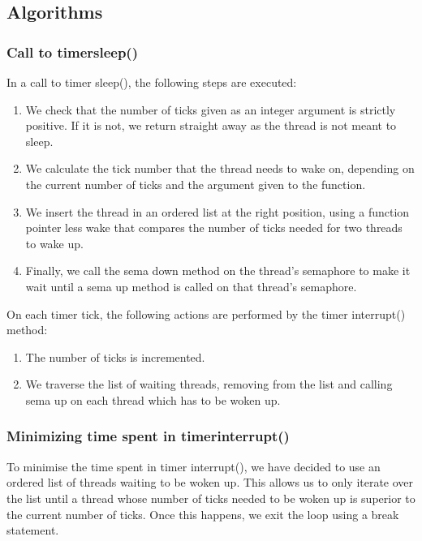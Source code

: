 \documentclass{article}
\renewcommand{\_}{\char`_}
\begin{document}
\subsection{Algorithms}
\subsubsection{Call to timer\textunderscore sleep()}

In a call to timer \textunderscore sleep(), the following steps are executed:

\begin{enumerate}
    \item We check that the number of ticks given as an integer argument is strictly positive. If it is not, we return straight away as the thread is not meant to sleep.
    \item We calculate the tick number that the thread needs to wake on, depending on the current number of ticks and the argument given to the function.
    \item We insert the thread in an ordered list at the right position, using a function pointer less \textunderscore wake that compares the number of ticks needed for two threads to wake up.
    \item Finally, we call the sema \textunderscore down method on the thread's semaphore to make it wait until a sema \textunderscore up method is called on that thread's semaphore.
\end{enumerate}

On each timer tick, the following actions are performed by the timer \textunderscore interrupt() method:

\begin{enumerate}
    \item The number of ticks is incremented.
    \item We traverse the list of waiting threads, removing from the list and calling sema \textunderscore up on each thread which has to be woken up.
\end{enumerate}

\subsubsection{Minimizing time spent in timer\textunderscore interrupt()}

To minimise the time spent in timer \textunderscore interrupt(), we have decided to use an ordered list of threads waiting to be woken up. This allows us to only iterate over the list until a thread whose number of ticks needed to be woken up is superior to the current number of ticks. Once this happens, we exit the loop using a break statement.  
\end{document}
